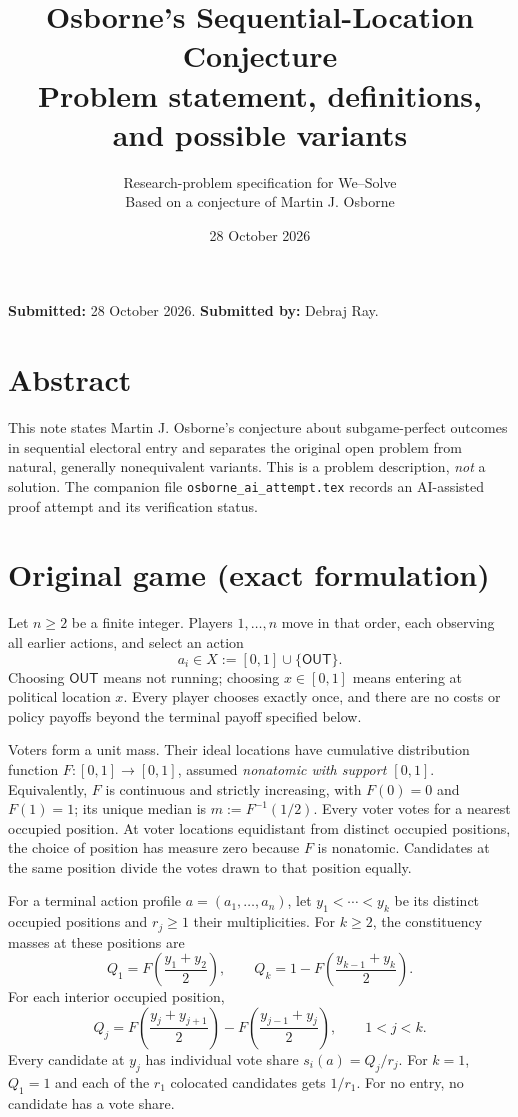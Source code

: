 \documentclass[11pt]{article}
\title{Osborne's Sequential-Location Conjecture\\\large Problem statement, definitions, and possible variants}
\author{Research-problem specification for We--Solve\\Based on a conjecture of Martin J. Osborne}
\date{28 October 2026}
\newcommand{\OUT}{\mathsf{OUT}}
\begin{document}
\maketitle
\noindent\textbf{Submitted:} 28 October 2026. \textbf{Submitted by:} Debraj Ray.
\section*{Abstract}
This note states Martin J. Osborne's conjecture about subgame-perfect outcomes in sequential electoral entry and separates the original open problem from natural, generally nonequivalent variants. This is a problem description, \emph{not} a solution. The companion file \texttt{osborne\_ai\_attempt.tex} records an AI-assisted proof attempt and its verification status.


\section{Original game (exact formulation)}
Let $n\ge2$ be a finite integer. Players $1,\ldots,n$ move in that order, each observing all earlier actions, and select an action
\[
 a_i\in X:=[0,1]\cup\{\OUT\}.
\]
Choosing $\OUT$ means not running; choosing $x\in[0,1]$ means entering at political location $x$. Every player chooses exactly once, and there are no costs or policy payoffs beyond the terminal payoff specified below.

Voters form a unit mass. Their ideal locations have cumulative distribution function $F:[0,1]\to[0,1]$, assumed \emph{nonatomic with support $[0,1]$}. Equivalently, $F$ is continuous and strictly increasing, with $F(0)=0$ and $F(1)=1$; its unique median is $m:=F^{-1}(1/2)$. Every voter votes for a nearest occupied position. At voter locations equidistant from distinct occupied positions, the choice of position has measure zero because $F$ is nonatomic. Candidates at the same position divide the votes drawn to that position equally.

For a terminal action profile $a=(a_1,\ldots,a_n)$, let $y_1<\cdots<y_k$ be its distinct occupied positions and $r_j\ge1$ their multiplicities. For $k\ge2$, the constituency masses at these positions are
\[
 Q_1=F\!\left(\frac{y_1+y_2}{2}\right),\qquad
 Q_k=1-F\!\left(\frac{y_{k-1}+y_k}{2}\right).
\]
For each interior occupied position,
\[
 Q_j=F\!\left(\frac{y_j+y_{j+1}}2\right)-F\!\left(\frac{y_{j-1}+y_j}2\right),\qquad 1<j<k.
\]
Every candidate at $y_j$ has individual vote share $s_i(a)=Q_j/r_j$. For $k=1$, $Q_1=1$ and each of the $r_1$ colocated candidates gets $1/r_1$. For no entry, no candidate has a vote share.
\end{document}
